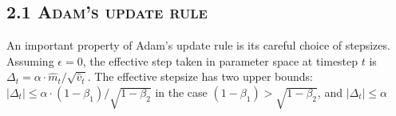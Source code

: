 \documentclass[11pt]{article}
\begin{document}
\subsection*{2.1 \textsc{Adam's update rule}}

An important property of Adam's update rule is its careful choice
of stepsizes. Assuming $\epsilon = 0$, the effective step taken in
parameter space at timestep $t$ is
$\Delta_t = \alpha \cdot \widehat{m}_t / \sqrt{\widehat{v}_t}$.
The effective stepsize has two upper bounds:
$|\Delta_t| \leq \alpha \cdot (1 - \beta_1) / \sqrt{1 - \beta_2}$ in
the case $(1 - \beta_1) > \sqrt{1 - \beta_2}$, and
$|\Delta_t| \leq \alpha$

\end{document}
